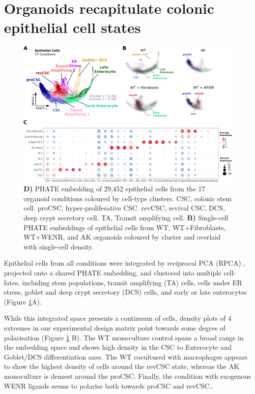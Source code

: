 \section{Organoids recapitulate colonic epithelial cell states}

\begin{figure}[H]
    \centering
    \includegraphics{04seq/figs/4SEQ_INTctrl.png}
    \caption{\textbf{D)} PHATE embedding of 29,452 epithelial cells from the 17 organoid conditions coloured by cell-type clusters. CSC, colonic stem cell. proCSC, hyper-proliferative CSC. revCSC, revival CSC. DCS, deep crypt secretory cell. TA, Transit amplifying cell. \textbf{B)} Single-cell PHATE embeddings of epithelial cells from WT, WT+Fibroblasts, WT+WENR, and AK organoids coloured by cluster and overlaid with single-cell density.}
    \label{fig:4intepi}
\end{figure}

Epithelial cells from all conditions were integrated by reciprocal PCA (RPCA) \cite{hao_integrated_2021}, projected onto a shared PHATE embedding, and clustered into multiple cell-fates, including stem populations, transit amplifying (TA) cells, cells under ER stress, goblet and deep crypt secretory (DCS) cells, and early or late enterocytes (Figure \ref{fig:4intepi}A). 

While this integrated space presents a continuum of cells, density plots of 4 extremes in our experimental design matrix point towards some degree of polarisation (Figure \ref{fig:4intepi} B). The WT monoculture control spans a broad range in the embedding space and shows high density in the CSC to Enterocyte and Goblet/DCS differentiation axes. The WT cocultured with macrophages appears to show the highest density of cells around the revCSC state, whereas the AK monoculture is densest around the proCSC. Finally, the condition with exogenous WENR ligands seems to polarise both towards proCSC and revCSC..

